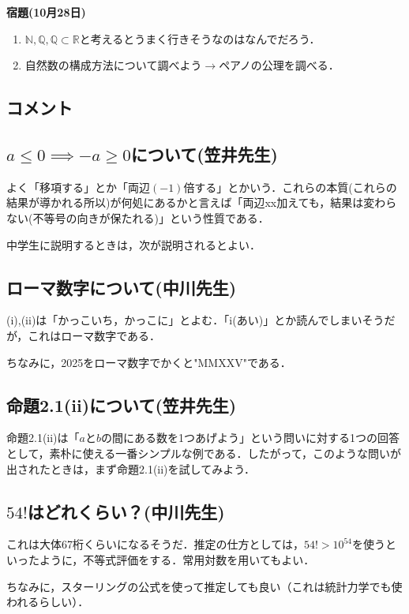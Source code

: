 \documentclass[dvipdfmx,11pt]{jsarticle}
\begin{document}
\textbf{宿題(10月28日)}
\begin{enumerate}[label=宿題\arabic*: ]
    \item $\mathbb{N},\mathbb{Q},\mathbb{Q} \subset \mathbb{R}$と考えるとうまく行きそうなのはなんでだろう．
    \item 自然数の構成方法について調べよう$\to$ペアノの公理を調べる．
\end{enumerate}

\noindent \hrulefill

\subsection*{コメント}
\subsection{$a\leq 0 \implies -a \geq 0$について(笠井先生)}
よく「移項する」とか「両辺$(-1)$倍する」とかいう．これらの本質(これらの結果が導かれる所以)が何処にあるかと言えば「両辺xx加えても，結果は変わらない(不等号の向きが保たれる)」という性質である．

中学生に説明するときは，次が説明されるとよい．

\subsection{ローマ数字について(中川先生)}
(i),(ii)は「かっこいち，かっこに」とよむ．「i(あい)」とか読んでしまいそうだが，これはローマ数字である．

ちなみに，2025をローマ数字でかくと"MMXXV"である．

\subsection{命題2.1(ii)について(笠井先生)}
命題2.1(ii)は「$a$と$b$の間にある数を1つあげよう」という問いに対する1つの回答として，素朴に使える一番シンプルな例である．したがって，このような問いが出されたときは，まず命題2.1(ii)を試してみよう．

\subsection{$54!$はどれくらい？(中川先生)}
これは大体67桁くらいになるそうだ．推定の仕方としては，$54! > 10^54$を使うといったように，不等式評価をする．常用対数を用いてもよい．

ちなみに，スターリングの公式を使って推定しても良い（これは統計力学でも使われるらしい）．
\end{document}
